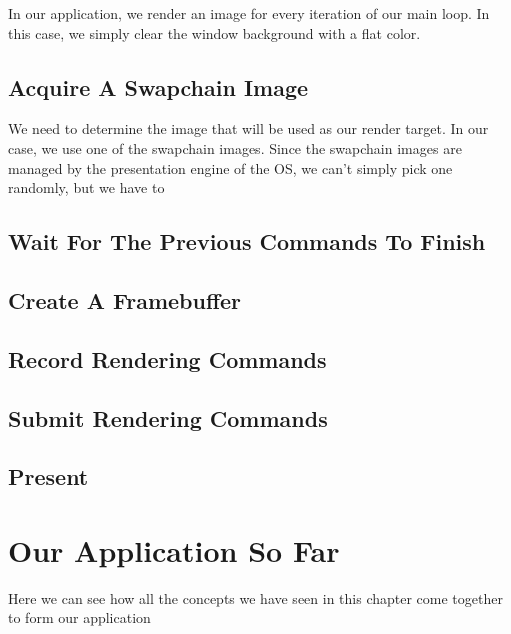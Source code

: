 In our application, we render an image for every iteration of our main loop.
In this case, we simply clear the window background with a flat color.

\subsection{Acquire A Swapchain Image}

We need to determine the image that will be used as our render target.
In our case, we use one of the swapchain images.
Since the swapchain images are managed by the presentation
engine of the OS, we can't simply pick one randomly, but we have to

\subsection{Wait For The Previous Commands To Finish}

\subsection{Create A Framebuffer}

\subsection{Record Rendering Commands}

\subsection{Submit Rendering Commands}

\subsection{Present}

\section{Our Application So Far}

Here we can see how all the concepts we have seen in this chapter come together
to form our application

\begin{minipage}{\linewidth}{\noindent}
    
\end{minipage}
